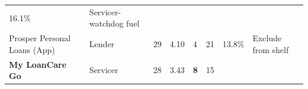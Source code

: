 \documentclass[
  10pt,
]{article}
\begin{document}
\begin{longtable}[]{@{}llllllll@{}}
\begin{minipage}[t]{0.10\columnwidth}
16.1\%\strut
\end{minipage} & \begin{minipage}[t]{0.10\columnwidth}\raggedright
Servicer-watchdog fuel\strut
\end{minipage}\tabularnewline
\begin{minipage}[t]{0.10\columnwidth}\raggedright
Prosper Personal Loans (App)\strut
\end{minipage} & \begin{minipage}[t]{0.10\columnwidth}\raggedright
Lender\strut
\end{minipage} & \begin{minipage}[t]{0.10\columnwidth}\raggedright
29\strut
\end{minipage} & \begin{minipage}[t]{0.10\columnwidth}\raggedright
4.10\strut
\end{minipage} & \begin{minipage}[t]{0.10\columnwidth}\raggedright
4\strut
\end{minipage} & \begin{minipage}[t]{0.10\columnwidth}\raggedright
21\strut
\end{minipage} & \begin{minipage}[t]{0.10\columnwidth}\raggedright
13.8\%\strut
\end{minipage} & \begin{minipage}[t]{0.10\columnwidth}\raggedright
Exclude from shelf\strut
\end{minipage}\tabularnewline
\begin{minipage}[t]{0.10\columnwidth}\raggedright
\textbf{My LoanCare Go}\strut
\end{minipage} & \begin{minipage}[t]{0.10\columnwidth}\raggedright
Servicer\strut
\end{minipage} & \begin{minipage}[t]{0.10\columnwidth}\raggedright
28\strut
\end{minipage} & \begin{minipage}[t]{0.10\columnwidth}\raggedright
3.43\strut
\end{minipage} & \begin{minipage}[t]{0.10\columnwidth}\raggedright
\textbf{8}\strut
\end{minipage} & \begin{minipage}[t]{0.10\columnwidth}\raggedright
15\strut
\end{minipage} & \begin{minipage}[t]{0.10\columnwidth}\raggedright

\end{minipage}
\end{longtable}
\end{document}
